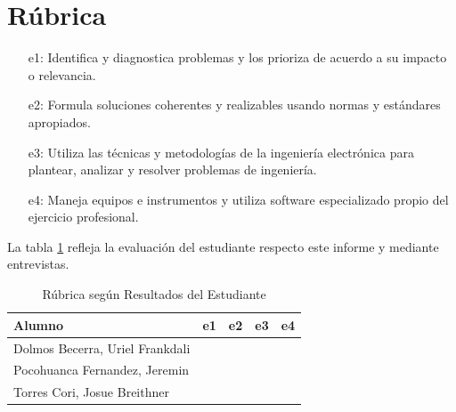 \documentclass[12pt,oneside,spanish]{article}
\begin{document}
\newpage
{} %
\section*{Rúbrica}
\begin{itemize}
\item[e1:] Identifica y diagnostica problemas y los prioriza de acuerdo a su impacto o relevancia.
\item[e2:] Formula soluciones coherentes y realizables usando normas y estándares apropiados.
\item[e3:] Utiliza las técnicas y metodologías de la ingeniería electrónica para plantear, analizar y resolver problemas de ingeniería.
\item[e4:] Maneja equipos e instrumentos y utiliza software especializado propio del ejercicio profesional.
\end{itemize}
La tabla \ref{tab:rubricas} refleja la evaluación del estudiante respecto este informe y mediante entrevistas. 

\begin{table}[h!]
\caption{Rúbrica según Resultados del Estudiante}
\centering
\begin{tabular}{lcccc}
\hline 
Alumno & e1 & e2 & e3 & e4\tabularnewline
\hline 
\hline 
Dolmos Becerra, Uriel Frankdali &  &  &  & \tabularnewline
\hline 
Pocohuanca Fernandez, Jeremin &  &  &  & \tabularnewline
\hline 
Torres Cori, Josue Breithner &  &  &  & \tabularnewline
\hline
\end{tabular}
\label{tab:rubricas}
\end{table}
\end{document}
